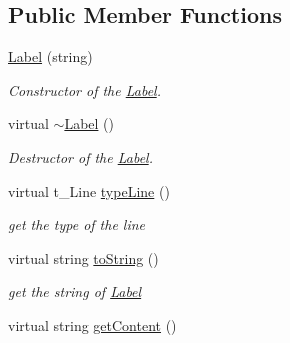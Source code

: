 \subsection*{Public Member Functions}
\begin{DoxyCompactItemize}
\item 
\hypertarget{classLabel_a48e774efc0e6e5cd0bf63a94527add17}{
\hyperlink{classLabel_a48e774efc0e6e5cd0bf63a94527add17}{Label} (string)}
\label{classLabel_a48e774efc0e6e5cd0bf63a94527add17}

\begin{DoxyCompactList}\small\item\em Constructor of the \hyperlink{classLabel}{Label}. \item\end{DoxyCompactList}\item 
\hypertarget{classLabel_ae0405d591a2ff63c03b104435e2a3066}{
virtual \hyperlink{classLabel_ae0405d591a2ff63c03b104435e2a3066}{$\sim$Label} ()}
\label{classLabel_ae0405d591a2ff63c03b104435e2a3066}

\begin{DoxyCompactList}\small\item\em Destructor of the \hyperlink{classLabel}{Label}. \item\end{DoxyCompactList}\item 
\hypertarget{classLabel_a83977f94c80e2a8fc38271ff6ffb2696}{
virtual t\_\-Line \hyperlink{classLabel_a83977f94c80e2a8fc38271ff6ffb2696}{typeLine} ()}
\label{classLabel_a83977f94c80e2a8fc38271ff6ffb2696}

\begin{DoxyCompactList}\small\item\em get the type of the line \item\end{DoxyCompactList}\item 
\hypertarget{classLabel_a2bf18281612263a76e02a9d1f3e3a009}{
virtual string \hyperlink{classLabel_a2bf18281612263a76e02a9d1f3e3a009}{toString} ()}
\label{classLabel_a2bf18281612263a76e02a9d1f3e3a009}

\begin{DoxyCompactList}\small\item\em get the string of \hyperlink{classLabel}{Label} \item\end{DoxyCompactList}\item 
\hypertarget{classLabel_a552b9c44da6aee5c68996e466391f04a}{
virtual string \hyperlink{classLabel_a552b9c44da6aee5c68996e466391f04a}{getContent} ()}
\label{classLabel_a552b9c44da6aee5c68996e466391f04a}


\end{DoxyCompactItemize}
